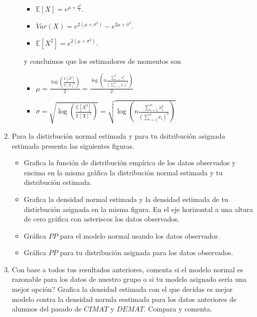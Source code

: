 \documentclass[letterpaper]{article}
\theoremstyle{definition}
\theoremstyle{lemathm}
\theoremstyle{lemathm}
\theoremstyle{lemathm}
\theoremstyle{lemademthm}
\newcommand{\pars}[1]{\left( #1 \right) }
\newcommand{\bracs}[1]{\left[ #1 \right] }
\newcommand{\EE}{\mathbb{E}}
\newcommand{\1}{\mathbbm{1}}
\begin{document}
\begin{enumerate}
\begin{enumerate}
			\begin{itemize}
				\item $\EE\bracs{X} = e^{\mu + \frac{\sigma^2}{2}}$.
				\item $Var\pars{X} = e^{2\pars{\mu + \sigma^2}} - e^{2\mu + \sigma^2}$.
				\item $\EE\bracs{X^2} = e^{2\pars{\mu + \sigma^2}}$.
			\end{itemize}

			y concluimos que los estimadores de momentos son

			\begin{itemize}
				\item $\mu = \frac{\log\pars{\frac{\EE\bracs{X^2}}{\EE\bracs{X}^4}}}{2} = \frac{\log\pars{n\frac{\sum_{i=1}^n x_i^2}{\pars{\sum_{i=1}^n x_i}^4}}}{2}$
				\item $\sigma = \sqrt{\log\pars{\frac{\EE\bracs{X^2}}{\EE\bracs{X}^2}}} = \sqrt{\log\pars{n\frac{\sum_{i=1}^n x_i^2}{\pars{\sum_{i=1}^n x_i}^2}}}$
			\end{itemize}

		\end{enumerate}

		\item Para la distirbución normal estimada y para tu dsitribución asignada estimada presenta las siguientes figuras.
		
		\begin{itemize}
			\item Grafica la función de distribución empírica de los datos observados y encima en la misma gráfica la distribución normal estimada y tu distribución estimada.
			


			\item Grafica la densidad normal estimada y la densidad estimada de tu distirbución asignada en la misma figura. En el eje horizontal a una altura de cero gráfica con asteriscos los datos observados.
			
			
			
			\item Gráfica $PP$ para el modelo normal usando los datos observador.
			
			
			
			\item Gráfica $PP$ para tu distribución asignada para los datos observados.
		
		
		
		\end{itemize}

		\item Con base a todos tus resultados anteriores, comenta si el modelo normal es razonable para los datos de nuestro grupo o si tu modelo asignado sería una mejor opción? Grafica la densidad estimada con el que decidas es mejor modelo contra la densidad normla eestimada para los datos anteriores de alumnos del pasado de $CIMAT$ y $DEMAT$. Compara y comenta.
		


    \end{enumerate}

	
\end{document}
